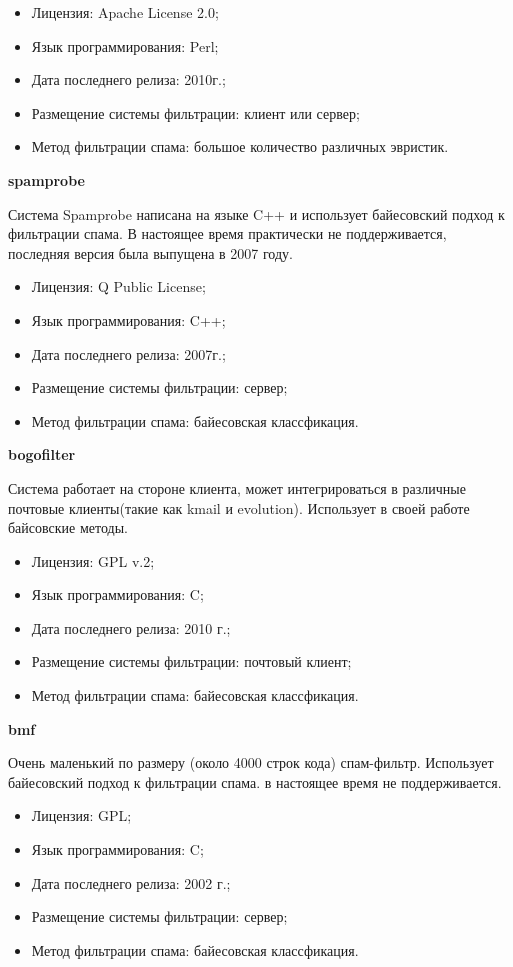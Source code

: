 \begin{itemize}
\item Лицензия: Apache License 2.0;
\item Язык программирования: Perl;
\item Дата последнего релиза: 2010г.;
\item Размещение системы фильтрации: клиент или сервер;
\item Метод фильтрации спама: большое количество различных эвристик.
\end{itemize}

\textbf{spamprobe}

Система Spamprobe написана на языке C++ и использует байесовский подход к фильтрации спама. В настоящее время практически не поддерживается, последняя версия была выпущена в 2007 году.
\begin{itemize}
\item Лицензия: Q Public License; 
\item Язык программирования: C++;
\item Дата последнего релиза: 2007г.;
\item Размещение системы фильтрации: сервер;
\item Метод фильтрации спама: байесовская классфикация.
\end{itemize}

\textbf{bogofilter}

Система работает на стороне клиента, может интегрироваться в различные почтовые клиенты(такие как kmail и evolution). Использует в своей работе байсовские методы.
\begin{itemize}
\item Лицензия: GPL v.2; 
\item Язык программирования: C;
\item Дата последнего релиза: 2010 г.;
\item Размещение системы фильтрации: почтовый клиент;
\item Метод фильтрации спама: байесовская классфикация.
\end{itemize}

\textbf{bmf}

Очень маленький по размеру (около 4000 строк кода) спам-фильтр. Использует байесовский подход к фильтрации спама. в настоящее время не поддерживается.
\begin{itemize}
\item Лицензия: GPL; 
\item Язык программирования: C;
\item Дата последнего релиза: 2002 г.;
\item Размещение системы фильтрации: сервер;
\item Метод фильтрации спама: байесовская классфикация.
\end{itemize}

